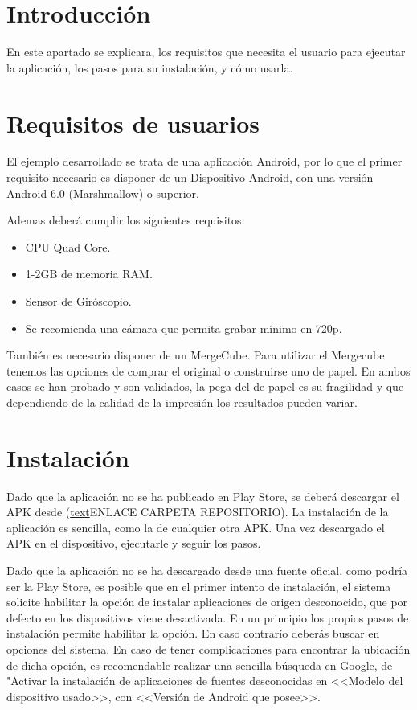 
\section{Introducción}
 En este apartado se explicara, los requisitos que necesita el usuario para ejecutar la aplicación, los pasos para su instalación, y cómo usarla.
  
\section{Requisitos de usuarios}
 El ejemplo desarrollado se trata de una aplicación Android, por lo que el primer requisito necesario es disponer de un Dispositivo Android, con una versión Android 6.0 (Marshmallow) o superior.
  
 Ademas deberá cumplir los siguientes requisitos\cite{vuforia_devices}:
 \begin{itemize}
 	\item CPU Quad Core.
 	\item 1-2GB de memoria RAM.
 	\item Sensor de Giróscopio.
 	\item Se recomienda una cámara que permita grabar mínimo en 720p.  
 \end{itemize}
También es necesario disponer de un MergeCube. Para utilizar el Mergecube tenemos las opciones de comprar el original o construirse uno de papel. En ambos casos se han probado y son validados, la pega del de papel es su fragilidad y que dependiendo de la calidad de la impresión los resultados pueden variar.

\section{Instalación}

Dado que la aplicación no se ha publicado en Play Store, se deberá descargar el APK desde (\href{URL}{text}ENLACE CARPETA REPOSITORIO).
La instalación de la aplicación es sencilla, como la de cualquier otra APK. Una vez descargado el APK en el dispositivo, ejecutarle y seguir los pasos. 

Dado que la aplicación no se ha descargado desde una fuente oficial, como podría ser la Play Store, es posible que en el primer intento de instalación, el sistema solicite habilitar la opción de instalar aplicaciones de origen desconocido, que por defecto en los dispositivos viene desactivada.
En un principio los propios pasos de instalación permite habilitar la opción. En caso contrarío deberás buscar en opciones del sistema. En caso de tener complicaciones para encontrar la ubicación de dicha opción, es recomendable realizar una sencilla búsqueda en Google, de "Activar la instalación de aplicaciones de fuentes desconocidas en <<Modelo del dispositivo usado>>, con <<Versión de Android que posee>>.


